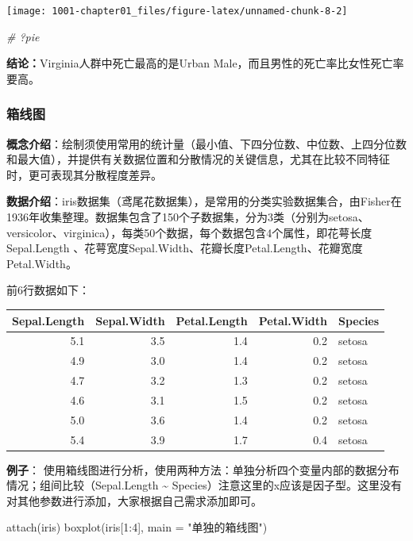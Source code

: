\documentclass[
]{book}
\newenvironment{Shaded}{\begin{snugshade}}{\end{snugshade}}
\newcommand{\AttributeTok}[1]{\textcolor[rgb]{0.77,0.63,0.00}{#1}}
\newcommand{\CommentTok}[1]{\textcolor[rgb]{0.56,0.35,0.01}{\textit{#1}}}
\newcommand{\DecValTok}[1]{\textcolor[rgb]{0.00,0.00,0.81}{#1}}
\newcommand{\FunctionTok}[1]{\textcolor[rgb]{0.00,0.00,0.00}{#1}}
\newcommand{\NormalTok}[1]{#1}
\newcommand{\SpecialCharTok}[1]{\textcolor[rgb]{0.00,0.00,0.00}{#1}}
\newcommand{\StringTok}[1]{\textcolor[rgb]{0.31,0.60,0.02}{#1}}
\begin{document}
\begin{center}\texttt{[image: 1001-chapter01\_files/figure-latex/unnamed-chunk-8-2]} \end{center}

\begin{Shaded}
\begin{Highlighting}[]
\CommentTok{\# ?pie}
\end{Highlighting}
\end{Shaded}

\textbf{结论：}Virginia人群中死亡最高的是Urban Male，而且男性的死亡率比女性死亡率要高。

\hypertarget{ux7bb1ux7ebfux56fe}{%
\subsubsection{箱线图}\label{ux7bb1ux7ebfux56fe}}

\textbf{概念介绍}：绘制须使用常用的统计量（最小值、下四分位数、中位数、上四分位数和最大值），并提供有关数据位置和分散情况的关键信息，尤其在比较不同特征时，更可表现其分散程度差异。

\textbf{数据介绍}：iris数据集（鸢尾花数据集），是常用的分类实验数据集合，由Fisher在1936年收集整理。数据集包含了150个子数据集，分为3类（分别为setosa、versicolor、virginica），每类50个数据，每个数据包含4个属性，即花萼长度Sepal.Length 、花萼宽度Sepal.Width、花瓣长度Petal.Length、花瓣宽度Petal.Width。

前6行数据如下：

\begin{tabular}{r|r|r|r|l}
\hline
Sepal.Length & Sepal.Width & Petal.Length & Petal.Width & Species\\
\hline
5.1 & 3.5 & 1.4 & 0.2 & setosa\\
\hline
4.9 & 3.0 & 1.4 & 0.2 & setosa\\
\hline
4.7 & 3.2 & 1.3 & 0.2 & setosa\\
\hline
4.6 & 3.1 & 1.5 & 0.2 & setosa\\
\hline
5.0 & 3.6 & 1.4 & 0.2 & setosa\\
\hline
5.4 & 3.9 & 1.7 & 0.4 & setosa\\
\hline
\end{tabular}

\textbf{例子}：
使用箱线图进行分析，使用两种方法：单独分析四个变量内部的数据分布情况；组间比较（Sepal.Length \textasciitilde{} Species）注意这里的x应该是因子型。这里没有对其他参数进行添加，大家根据自己需求添加即可。

\begin{Shaded}
\begin{Highlighting}[]
\FunctionTok{attach}\NormalTok{(iris)}
\FunctionTok{boxplot}\NormalTok{(iris[}\DecValTok{1}\SpecialCharTok{:}\DecValTok{4}\NormalTok{], }\AttributeTok{main =} \StringTok{"单独的箱线图"}\NormalTok{)}
\end{Highlighting}
\end{Shaded}
\end{document}
